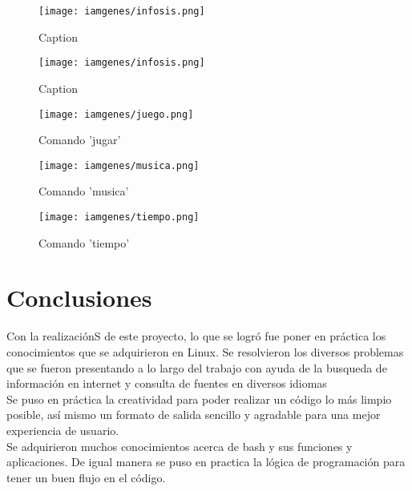 \documentclass[titlepage]{article}
\begin{document}
\begin{figure}[h]
    \centering
    \texttt{[image: iamgenes/infosis.png]}
    \caption{Caption}
    \label{fig:infosis}
\end{figure}

\begin{figure}[h]
    \centering
    \texttt{[image: iamgenes/infosis.png]}
    \caption{Caption}
    \label{fig:infosis}
\end{figure}

\begin{figure}[h]
    \centering
    \texttt{[image: iamgenes/juego.png]}
    \caption{Comando 'jugar'}
    \label{fig:juego}
\end{figure}

\begin{figure}[h]
    \centering
    \texttt{[image: iamgenes/musica.png]}
    \caption{Comando 'musica'}
    \label{fig:musica}
\end{figure}

\begin{figure}[H]
    \centering
    \texttt{[image: iamgenes/tiempo.png]}
    \caption{Comando 'tiempo'}
    \label{fig:tiempo}
\end{figure}

\newpage

\section{Conclusiones}

Con la realizaciónS de este proyecto, lo que se logró fue poner en práctica los conocimientos que se adquirieron en Linux. Se resolvieron los diversos problemas que se fueron presentando a lo largo del trabajo con ayuda de la busqueda de información en internet y consulta de fuentes en diversos idiomas\\Se puso en práctica la creatividad para poder realizar un código lo más limpio posible, así mismo un formato de salida sencillo y agradable para una mejor experiencia de usuario.\\Se adquirieron muchos conocimientos acerca de bash y sus funciones y aplicaciones. De igual manera se puso en practica la lógica de programación para tener un buen flujo en el código. \\
\end{document}
